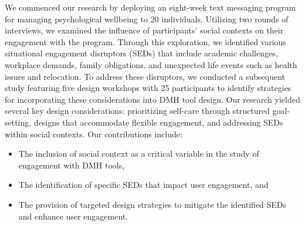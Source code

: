 





We commenced our research by deploying an eight-week text messaging program for managing psychological wellbeing to 20 individuals. Utilizing two rounds of interviews, we examined the influence of participants' social contexts on their engagement with the program. Through this exploration, we identified various situational engagement disruptors (SEDs) that include academic challenges, workplace demands, family obligations, and unexpected life events such as health issues and relocation. 
To address these disruptors, we conducted a subsequent study featuring five design workshops with 25 participants to identify strategies for incorporating these considerations into DMH tool design. Our research yielded several key design considerations: prioritizing self-care through structured goal-setting, designs that accommodate flexible engagement, and addressing SEDs within social contexts.
Our contributions include:

\begin{itemize}
    \item The inclusion of social context as a critical variable in the study of engagement with DMH tools,
    \item The identification of specific SEDs that impact user engagement, and
    \item The provision of targeted design strategies to mitigate the identified SEDs and enhance user engagement.
\end{itemize}

